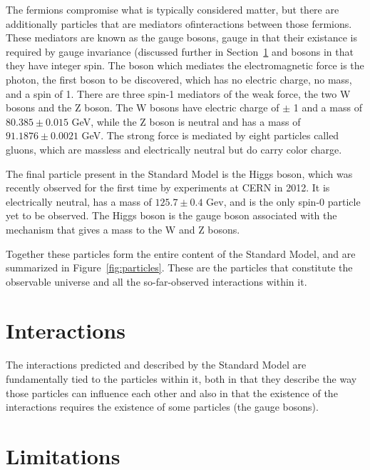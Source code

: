 The fermions compromise what is typically considered matter, but there are additionally particles that are mediators ofinteractions between those fermions.
These mediators are known as the gauge bosons, gauge in that their existance is required by gauge invariance (discussed further in Section~\ref{sec:interactions} and bosons in that they have integer spin.
The boson which mediates the electromagnetic force is the photon, the first boson to be discovered, which has no electric charge, no mass, and a spin of 1.
There are three spin-1 mediators of the weak force, the two W bosons and the Z boson. 
The W bosons have electric charge of $\pm$ 1 and a mass of $80.385 \pm 0.015$ GeV, while the Z boson is neutral and has a mass of $91.1876 \pm 0.0021$ GeV. 
The strong force is mediated by eight particles called gluons, which are massless and electrically neutral but do carry color charge. 

The final particle present in the Standard Model is the Higgs boson, which was recently observed for the first time by experiments at CERN in 2012. 
It is electrically neutral, has a mass of $125.7 \pm 0.4$ Gev, and is the only spin-0 particle yet to be observed. 
The Higgs boson is the gauge boson associated with the mechanism that gives a mass to the W and Z bosons.

Together these particles form the entire content of the Standard Model, and are summarized in Figure~\ref{fig:particles}. These are the particles that constitute the observable universe and all the so-far-observed interactions within it.



\section{Interactions}
\label{sec:interactions}

The interactions predicted and described by the Standard Model are fundamentally tied to the particles within it, both in that they describe the way those particles can influence each other and also in that the existence of the interactions requires the existence of some particles (the gauge bosons). 


\section{Limitations}
\label{sec:limitations}


